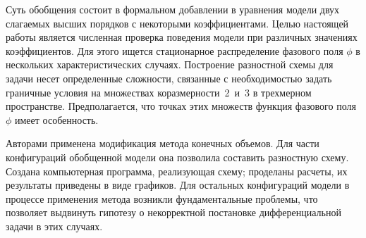 Суть обобщения состоит в формальном добавлении в уравнения модели двух слагаемых высших порядков с некоторыми коэффициентами. Целью настоящей работы является численная проверка поведения модели при различных значениях коэффициентов. Для этого ищется стационарное распределение фазового поля $\phi$ в нескольких характеристических случаях. Построение разностной схемы для задачи несет определенные сложности, связанные с необходимостью задать граничные условия на множествах коразмерности~2~и~3 в трехмерном пространстве. Предполагается, что точках этих множеств функция фазового поля $\phi$ имеет особенность.

Авторами применена модификация метода конечных объемов. Для части конфигураций обобщенной модели она позволила составить разностную схему. Создана компьютерная программа, реализующая схему; проделаны расчеты, их результаты приведены в виде графиков. Для остальных конфигураций модели в процессе применения метода возникли фундаментальные проблемы, что позволяет выдвинуть гипотезу о некорректной постановке дифференциальной задачи в этих случаях.